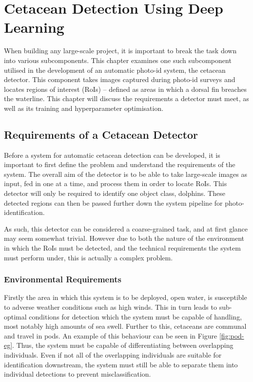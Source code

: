 \chapter{Cetacean Detection Using Deep Learning}\label{ch:cetDet}

When building any large-scale project, it is important to break the task down into various subcomponents. This chapter examines one such subcomponent utilised in the development of an automatic photo-id system, the cetacean detector. This component takes images captured during photo-id surveys and locates regions of interest (RoIs) -- defined as areas in which a dorsal fin breaches the waterline. This chapter will discuss the requirements a detector must meet, as well as its training and hyperparameter optimisation. 

\section{Requirements of a Cetacean Detector}\label{ch:cetDet,sec:requirements}

Before a system for automatic cetacean detection can be developed, it is important to first define the problem and understand the requirements of the system. The overall aim of the detector is to be able to take large-scale images as input, fed in one at a time, and process them in order to locate RoIs. This detector will only be required to identify one object class, dolphins. These detected regions can then be passed further down the system pipeline for photo-identification. 

 As such, this detector can be considered a coarse-grained task, and at first glance may seem somewhat trivial. However due to both the nature of the environment in which the RoIs must be detected, and the technical requirements the system must perform under, this is actually a complex problem. 
 
 \subsection{Environmental Requirements}\label{ch:cetDet,sec:requirements,sub:environmental}
 
 Firstly the area in which this system is to be deployed, open water, is susceptible to adverse weather conditions such as high winds. This in turn leads to sub-optimal conditions for detection which the system must be capable of handling, most notably high amounts of sea swell. Further to this, cetaceans are communal and travel in pods. An example of this behaviour can be seen in Figure \ref{fig:pod-eg}. Thus, the system must be capable of differentiating between overlapping individuals. Even if not all of the overlapping individuals are suitable for identification downstream, the system must still be able to separate them into individual detections to prevent misclassification.
 
